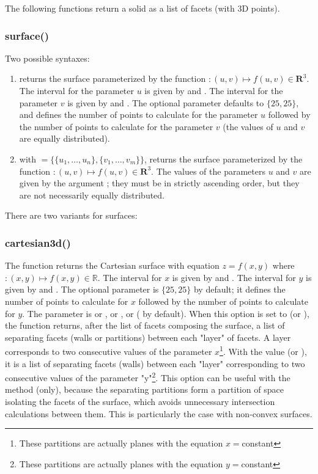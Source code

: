 The following functions return a solid as a list of facets (with 3D points).

\subsubsection{surface()}

Two possible syntaxes:
\begin{enumerate}
    \item {} returns the surface parameterized by the function $\colon(u,v) \mapsto f(u,v)\in \mathbf R^3$. The interval for the parameter $u$ is given by  and . The interval for the parameter $v$ is given by  and . The optional parameter  defaults to $\{25,25\}$, and defines the number of points to calculate for the parameter $u$ followed by the number of points to calculate for the parameter $v$ (the values ​​of $u$ and $v$ are equally distributed).

    \item {} with $=\{\{u_1,\ldots,u_n\}, \{v_1,\ldots,v_m\}\}$, returns the surface parameterized by the function $\colon(u,v) \mapsto f(u,v)\in \mathbf R^3$. The values ​​of the parameters $u$ and $v$ are given by the argument ; they must be in strictly ascending order, but they are not necessarily equally distributed.
\end{enumerate}

There are two variants for surfaces:

\subsubsection{cartesian3d()}

The function  returns the Cartesian surface with equation $z=f(x,y)$ where $\colon(x,y)\mapsto f(x,y)\in\mathbb R$. The interval for $x$ is given by  and . The interval for $y$ is given by  and . The optional parameter  is $\{25,25\}$ by default; it defines the number of points to calculate for $x$ followed by the number of points to calculate for $y$. The parameter  is  or , or , or  ( by default). When this option is set to  (or ), the function returns, after the list of facets composing the surface, a list of separating facets (walls or partitions) between each "layer" of facets. A layer corresponds to two consecutive values ​​of the parameter $x$\footnote{These partitions are actually planes with the equation $x=$constant}. With the value  (or ), it is a list of separating facets (walls) between each "layer" corresponding to two consecutive values ​​of the parameter "y"\footnote{These partitions are actually planes with the equation $y=$constant}. This option can be useful with the  method (only), because the separating partitions form a partition of space isolating the facets of the surface, which avoids unnecessary intersection calculations between them. This is particularly the case with non-convex surfaces.

